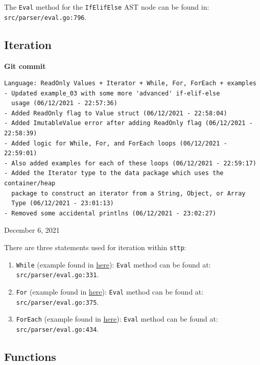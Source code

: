 \documentclass[]{full}
\theoremstyle{definition}
\begin{document}
The \verb|Eval| method for the \verb|IfElifElse| AST node can be found in: \verb|src/parser/eval.go:796|.

\subsection{Iteration}

\begin{center}
    \textbf{Git commit}
    \begin{verbatim}
Language: ReadOnly Values + Iterator + While, For, ForEach + examples
- Updated example_03 with some more 'advanced' if-elif-else 
  usage (06/12/2021 - 22:57:36)
- Added ReadOnly flag to Value struct (06/12/2021 - 22:58:04)
- Added ImutableValue error after adding ReadOnly flag (06/12/2021 - 22:58:39)
- Added logic for While, For, and ForEach loops (06/12/2021 - 22:59:01)
- Also added examples for each of these loops (06/12/2021 - 22:59:17)
- Added the Iterator type to the data package which uses the container/heap
  package to construct an iterator from a String, Object, or Array
  Type (06/12/2021 - 23:01:13)
- Removed some accidental printlns (06/12/2021 - 23:02:27)
    \end{verbatim}
    \vspace{-1em}
    \tiny{December 6, 2021}
\end{center}

There are three statements used for iteration within \verb|sttp|:

\begin{enumerate}
    \item \verb|While| (example found in \hyperref[appendix:sttp-examples-4]{here}): \verb|Eval| method can be found at: \verb|src/parser/eval.go:331|.
    \item \verb|For| (example found in \hyperref[appendix:sttp-examples-5]{here}): \verb|Eval| method can be found at: \verb|src/parser/eval.go:375|.
    \item \verb|ForEach| (example found in \hyperref[appendix:sttp-examples-6]{here}): \verb|Eval| method can be found at: \verb|src/parser/eval.go:434|.
\end{enumerate}

\subsection{Functions}
\end{document}
